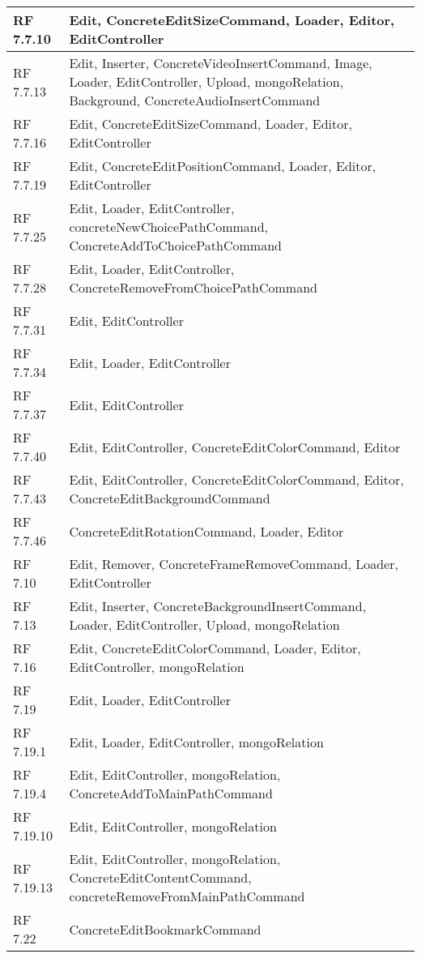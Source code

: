 {\begin{center}
\begin{longtable} [c]{| p{2cm} | p{13cm} |}
	 \hline 
	RF 7.7.10 & Edit, ConcreteEditSizeCommand, Loader, Editor, EditController\\ 
	 \hline 
	RF 7.7.13 & Edit, Inserter, ConcreteVideoInsertCommand, Image, Loader, EditController, Upload, mongoRelation, Background, ConcreteAudioInsertCommand\\ 
	 \hline 
	RF 7.7.16 & Edit, ConcreteEditSizeCommand, Loader, Editor, EditController\\ 
	 \hline 
	RF 7.7.19 & Edit, ConcreteEditPositionCommand, Loader, Editor, EditController\\ 
	 \hline 
	RF 7.7.25 & Edit, Loader, EditController, concreteNewChoicePathCommand, ConcreteAddToChoicePathCommand\\ 
	 \hline 
	RF 7.7.28 & Edit, Loader, EditController, ConcreteRemoveFromChoicePathCommand\\ 
	 \hline 
	RF 7.7.31 & Edit, EditController\\ 
	 \hline 
	RF 7.7.34 & Edit, Loader, EditController\\ 
	 \hline 
	RF 7.7.37 & Edit, EditController\\ 
	 \hline 
	RF 7.7.40 & Edit, EditController, ConcreteEditColorCommand, Editor\\ 
	 \hline 
	RF 7.7.43 & Edit, EditController, ConcreteEditColorCommand, Editor, ConcreteEditBackgroundCommand\\ 
	 \hline 
	RF 7.7.46 & ConcreteEditRotationCommand, Loader, Editor\\ 
	 \hline 
	RF 7.10 & Edit, Remover, ConcreteFrameRemoveCommand, Loader, EditController\\ 
	 \hline 
	RF 7.13 & Edit, Inserter, ConcreteBackgroundInsertCommand, Loader, EditController, Upload, mongoRelation\\ 
	 \hline 
	RF 7.16 & Edit, ConcreteEditColorCommand, Loader, Editor, EditController, mongoRelation\\ 
	 \hline 
	RF 7.19 & Edit, Loader, EditController\\ 
	 \hline 
	RF 7.19.1 & Edit, Loader, EditController, mongoRelation\\ 
	 \hline 
	RF 7.19.4 & Edit, EditController, mongoRelation, ConcreteAddToMainPathCommand\\ 
	 \hline 
	RF 7.19.10 & Edit, EditController, mongoRelation\\ 
	 \hline 
	RF 7.19.13 &Edit, EditController, mongoRelation, ConcreteEditContentCommand, concreteRemoveFromMainPathCommand\\ 
	 \hline 
	RF 7.22 & ConcreteEditBookmarkCommand\\ 

\end{longtable}
\end{center}}
